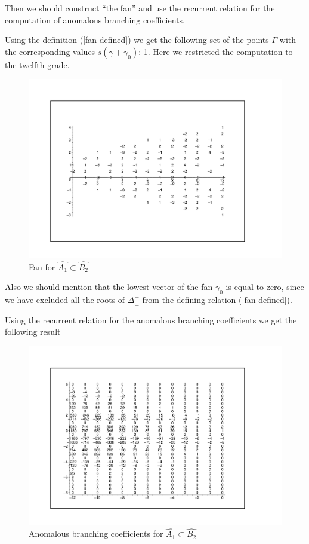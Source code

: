 \documentclass[a4paper,12pt]{article}
\theoremstyle{definition} \newtheorem{Def}{Definition}
\begin{document}
Then we should construct ``the fan'' and use the recurrent relation for the computation of anomalous branching coefficients.

Using the definition (\ref{fan-defined}) we get the following set of
the points $\Gamma$ with the corresponding values $s(\gamma+\gamma_0)$: \ref{fig:AffineB2A1Fan}.
Here we restricted the computation to the twelfth grade.
\begin{figure}[ph]
  \centering
  \includegraphics[width=130mm]{AffineB2_A1_fan.pdf}
  \caption{Fan for $\hat{A_1}\subset \hat{B_2}$}
  \label{fig:AffineB2A1Fan}
\end{figure}

Also we should mention that the lowest vector of the fan $\gamma_0$ is equal to zero, since we have excluded all the roots of $\Delta^{+}_{\bot}$ from the defining relation (\ref{fan-defined}).

Using the recurrent relation for the anomalous branching coefficients we get the following result
\begin{figure}[ph]
  \centering
  \includegraphics[width=130mm]{AffineB2_A1_branching.pdf}
  \caption{Anomalous branching coefficients for $\hat{A_1}\subset \hat{B_2}$}
  \label{fig:AffineB2_A1_branching}
\end{figure}
\end{document}
